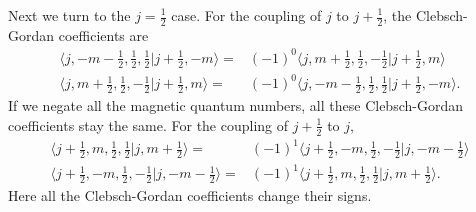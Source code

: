 \documentclass[pra,amsfonts,showpacs,preprint,showkeys]{revtex4}
\begin{document}
Next we turn to the $j=\frac{1}{2}$ case.
For the coupling of $j$ to $j+\frac{1}{2}$, the  Clebsch-Gordan
coefficients are
\begin{align}
\langle
j,-m-\frac{1}{2},\frac{1}{2},\frac{1}{2}|j+\frac{1}{2},-m\rangle =
&(-1)^{0}\langle
j,m+\frac{1}{2},\frac{1}{2},-\frac{1}{2}|j+\frac{1}{2},m\rangle\nonumber \\
\langle
j,m+\frac{1}{2},\frac{1}{2},-\frac{1}{2}|j+\frac{1}{2},m\rangle =
&(-1)^{0}\langle
j,-m-\frac{1}{2},\frac{1}{2},\frac{1}{2}|j+\frac{1}{2},-m\rangle.
\end{align}
If we negate all the magnetic quantum numbers, all these
Clebsch-Gordan coefficients stay the same. For the coupling of
$j+\frac{1}{2}$ to $j$,
\begin{align}
\langle
j+\frac{1}{2},m,\frac{1}{2},\frac{1}{2}|j,m+\frac{1}{2}\rangle =
&(-1)^{1}\langle
j+\frac{1}{2},-m,\frac{1}{2},-\frac{1}{2}|j,-m-\frac{1}{2}\rangle\nonumber\\
\langle
j+\frac{1}{2},-m,\frac{1}{2},-\frac{1}{2}|j,-m-\frac{1}{2}\rangle
= &(-1)^{1}\langle
j+\frac{1}{2},m,\frac{1}{2},\frac{1}{2}|j,m+\frac{1}{2}\rangle.
\end{align}
Here all the Clebsch-Gordan coefficients change their signs.
\end{document}
